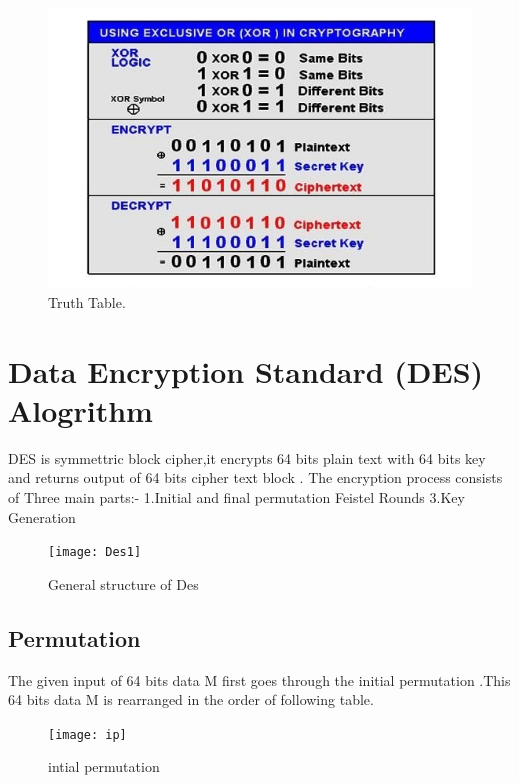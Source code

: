 \documentclass[11pt]{article}
\begin{document}
\begin{figure}[h!]
	\begin{center}
		\includegraphics[scale=1.5]{xor}
	\end{center}
	\caption{Truth Table.}\label{nice_figure}
\end{figure}

 \section{Data Encryption Standard (DES) Alogrithm}
 DES\cite{source} is symmettric block cipher,it encrypts 64 bits plain text with 64 bits key and returns output of 64 bits cipher text block .
 The encryption process consists of Three main parts:-\newline
 1.Initial and final permutation Feistel Rounds\newline
 3.Key Generation\newline
  \begin{figure}[h!]
  	\begin{center}
  		\texttt{[image: Des1]}
  	\end{center}
  	\caption{General structure of Des}\label{nice_figure}
  \end{figure}
  
 \subsection{Permutation}
 The given input of 64 bits data M first goes through the initial permutation .This 64 bits data M is rearranged in the  order of following table.
 \begin{figure}[h!]
 	\begin{center}
 		\texttt{[image: ip]}
 	\end{center}
 	\caption{intial permutation}\label{nice_figure}
 \end{figure}
\end{document}
